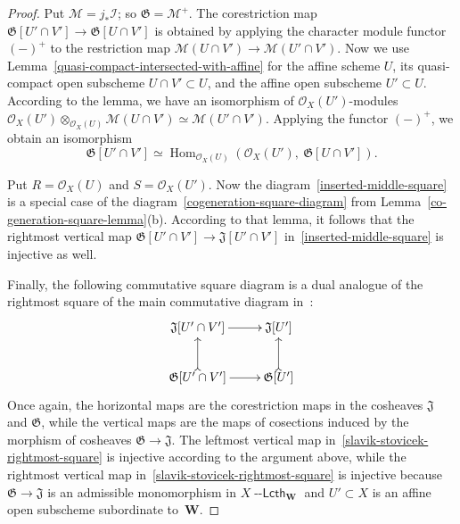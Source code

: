 \documentclass[12pt,a4paper]{amsart}
\newcommand{\+}{\nobreakdash-}
\renewcommand{\:}{\colon}
\newcommand{\rarrow}{\longrightarrow}
\newcommand{\ot}{\otimes}
\DeclareMathOperator{\Hom}{Hom}
\newcommand{\Lcth}{{\operatorname{\mathsf{--Lcth}}}}
\newcommand{\bW}{\mathbf W}
\newcommand{\cO}{\mathcal O}
\newcommand{\cI}{\mathcal I}
\newcommand{\cM}{\mathcal M}
\newcommand{\fG}{\mathfrak G}
\newcommand{\fJ}{\mathfrak J}
\theoremstyle{plain}
\theoremstyle{definition}
\begin{document}
\begin{proof}
 Put $\cM=j_*\cI$; so $\fG=\cM^+$.
 The corestriction map $\fG[U'\cap V']\rarrow\fG[U\cap V']$ is
obtained by applying the character module functor $({-})^+$
to the restriction map $\cM(U\cap V')\rarrow\cM(U'\cap V')$.
 Now we use Lemma~\ref{quasi-compact-intersected-with-affine} for
the affine scheme $U$, its quasi-compact open subscheme $U\cap V'
\subset U$, and the affine open subscheme $U'\subset U$.
 According to the lemma, we have an isomorphism of $\cO_X(U')$\+modules
$\cO_X(U')\ot_{\cO_X(U)}\cM(U\cap V')\simeq\cM(U'\cap V')$.
 Applying the functor $({-})^+$, we obtain an isomorphism
$$
 \fG[U'\cap V']\simeq\Hom_{\cO_X(U)}(\cO_X(U'),\>\fG[U\cap V']).
$$

 Put $R=\cO_X(U)$ and $S=\cO_X(U')$.
 Now the diagram~\eqref{inserted-middle-square} is a special case
of the diagram~\eqref{cogeneration-square-diagram}
from Lemma~\ref{co-generation-square-lemma}(b).
 According to that lemma, it follows that the rightmost vertical
map $\fG[U'\cap V']\rarrow\fJ[U'\cap V']$
in~\eqref{inserted-middle-square} is injective as well.

 Finally, the following commutative square diagram is a dual analogue
of the rightmost square of the main commutative diagram
in~\cite[proof of Theorem~2.2]{SS}:
\begin{equation} \label{slavik-stovicek-rightmost-square}
\begin{gathered}
 \xymatrix{
  \fJ[U'\cap V'] \ar[r] & \fJ[U'] \\
  \fG[U'\cap V'] \ar@{>->}[u] \ar[r] & \fG[U'] \ar@{>->}[u]
 }
\end{gathered}
\end{equation}
 Once again, the horizontal maps are the corestriction maps in
the cosheaves $\fJ$ and $\fG$, while the vertical maps are the maps of
cosections induced by the morphism of cosheaves $\fG\rarrow\fJ$.
 The leftmost vertical map
in~\eqref{slavik-stovicek-rightmost-square} is injective according to
the argument above, while the rightmost vertical map
in~\eqref{slavik-stovicek-rightmost-square} is injective because
$\fG\rarrow\fJ$ is an admissible monomorphism in $X\Lcth_\bW$ and
$U'\subset X$ is an affine open subscheme subordinate to~$\bW$.


\end{proof}
\end{document}
